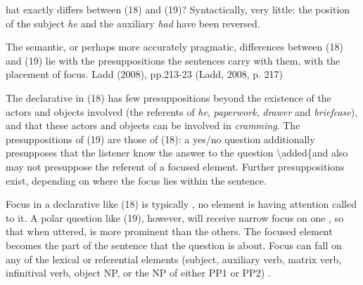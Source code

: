 \documentclass[12pt,oneside]{book}
\begin{document}
hat exactly differs between (18) and (19)? Syntactically, very little: the position of the subject \emph{he} and the auxiliary \emph{had} have been reversed.

The semantic, or perhaps more accurately pragmatic, differences between (18) and (19) lie with the presuppositions the sentences carry with them,  with the placement of focus.  Ladd (2008), pp.213-23 (Ladd, 2008, p. 217)

The declarative in (18) has few presuppositions beyond the existence of the actors and objects involved (the referents of \emph{he}, \emph{paperwork}, \emph{drawer} and \emph{briefcase}), and that these actors and objects can be involved in \emph{cramming}. The presuppositions of (19) are  those of (18):  a yes/no question additionally presupposes that the listener  know the answer to the question \textbackslash{}added\{and also may not presuppose the referent of a focused element. Further presuppositions  exist, depending on where the focus lies within the sentence.

Focus in a declarative like (18) is typically ,  no element is having  attention called to it. A polar question like (19), however, will  receive narrow focus on one , so that when uttered,   is more prominent than the others. The focused element becomes the part of the sentence that the question is about. Focus can fall on any of the lexical or referential elements  (subject, auxiliary verb, matrix verb, infinitival verb, object NP, or the NP of either PP1 or PP2) . 
\end{document}
